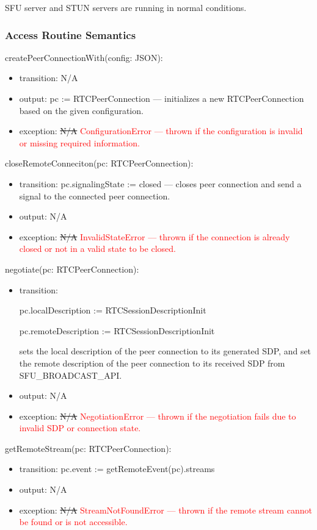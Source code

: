 \documentclass[12pt, titlepage]{article}
\newcommand{\rt}[1]{\textcolor{red}{#1}}
\begin{document}
SFU server and STUN servers are running in normal conditions.

\subsubsection{Access Routine Semantics}

\noindent createPeerConnectionWith(config: JSON):
\begin{itemize}
\item transition: N/A
\item output: pc := RTCPeerConnection --- initializes a new RTCPeerConnection based
  on the given configuration.
\item exception: \sout{N/A} \rt{ConfigurationError --- thrown if the configuration is invalid or missing required information.}
\end{itemize}


\noindent closeRemoteConneciton(pc: RTCPeerConnection):
\begin{itemize}
\item transition: pc.signalingState := closed --- closes peer connection and send a
  signal to the connected peer connection.
\item output: N/A
\item exception: \sout{N/A} \rt{InvalidStateError --- thrown if the connection is already closed or not in a valid state to be closed.}
\end{itemize}


\noindent negotiate(pc: RTCPeerConnection):
\begin{itemize}
\item transition:

  pc.localDescription := RTCSessionDescriptionInit

  pc.remoteDescription := RTCSessionDescriptionInit

  sets the local description of the peer connection to its generated SDP, and
  set the remote description of the peer connection to its received SDP from
  SFU\_BROADCAST\_API.
\item output: N/A
\item exception: \sout{N/A} \rt{NegotiationError --- thrown if the negotiation fails due to invalid SDP or connection state.}
\end{itemize}


\noindent getRemoteStream(pc: RTCPeerConnection):
\begin{itemize}
\item transition: pc.event := getRemoteEvent(pc).streams
\item output: N/A
\item exception: \sout{N/A} \rt{StreamNotFoundError --- thrown if the remote stream cannot be found or is not accessible.}
\end{itemize}
\end{document}
